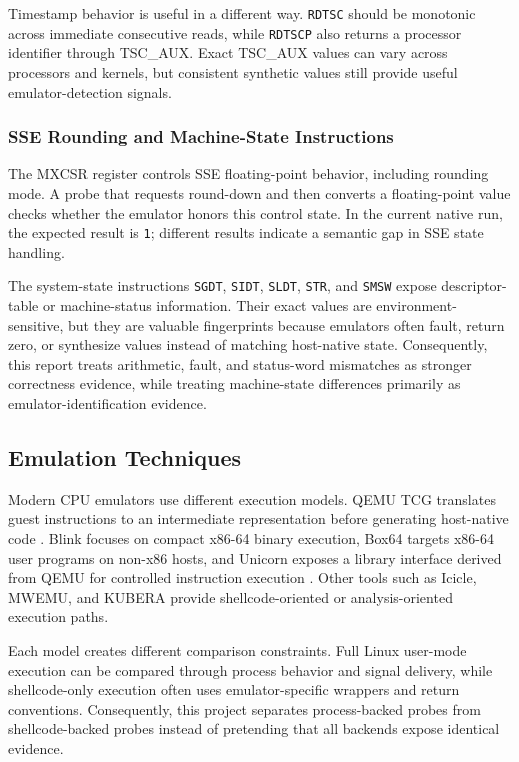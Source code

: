 Timestamp behavior is useful in a different way. \texttt{RDTSC} should be monotonic across immediate consecutive reads, while \texttt{RDTSCP} also returns a processor identifier through TSC\_AUX. Exact TSC\_AUX values can vary across processors and kernels, but consistent synthetic values still provide useful emulator-detection signals.

\subsubsection{SSE Rounding and Machine-State Instructions}

The MXCSR register controls SSE floating-point behavior, including rounding mode. A probe that requests round-down and then converts a floating-point value checks whether the emulator honors this control state. In the current native run, the expected result is \texttt{1}; different results indicate a semantic gap in SSE state handling.

The system-state instructions \texttt{SGDT}, \texttt{SIDT}, \texttt{SLDT}, \texttt{STR}, and \texttt{SMSW} expose descriptor-table or machine-status information. Their exact values are environment-sensitive, but they are valuable fingerprints because emulators often fault, return zero, or synthesize values instead of matching host-native state. Consequently, this report treats arithmetic, fault, and status-word mismatches as stronger correctness evidence, while treating machine-state differences primarily as emulator-identification evidence.

\subsection{Emulation Techniques}

Modern CPU emulators use different execution models. QEMU TCG translates guest instructions to an intermediate representation before generating host-native code \cite{bellard2005qemu}. Blink focuses on compact x86-64 binary execution, Box64 targets x86-64 user programs on non-x86 hosts, and Unicorn exposes a library interface derived from QEMU for controlled instruction execution \cite{unicorn2015}. Other tools such as Icicle, MWEMU, and KUBERA provide shellcode-oriented or analysis-oriented execution paths.

Each model creates different comparison constraints. Full Linux user-mode execution can be compared through process behavior and signal delivery, while shellcode-only execution often uses emulator-specific wrappers and return conventions. Consequently, this project separates process-backed probes from shellcode-backed probes instead of pretending that all backends expose identical evidence.
